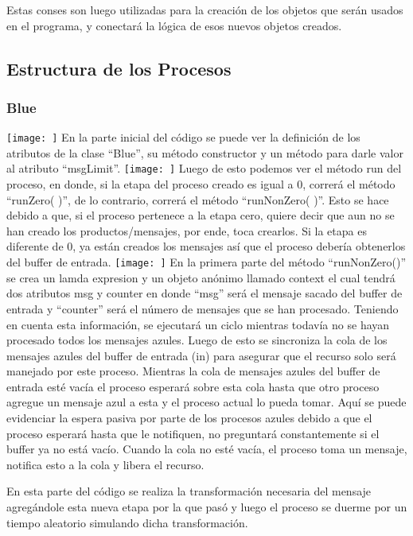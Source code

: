 \documentclass[a4paper]{article}
\begin{document}
    Estas conses son luego utilizadas para la creación de los objetos
    que serán usados en el programa, y conectará la lógica de esos
    nuevos objetos creados. 

    \subsection{Estructura de los Procesos}
        \subsubsection{Blue}
        \texttt{[image: ]}
        En la parte inicial del código se puede ver la definición de los atributos de la clase “Blue”, su método constructor y un método para darle valor al atributo “msgLimit”. 
        \texttt{[image: ]}
        Luego de esto podemos ver el método run del proceso, en donde, si la etapa del proceso creado es igual a 0, correrá el método “runZero( )”, de lo contrario, correrá el método “runNonZero( )”. Esto se hace debido a que, si el proceso pertenece a la etapa cero, quiere decir que aun no se han creado los productos/mensajes, por ende, toca crearlos. Si la etapa es diferente de 0, ya están creados los mensajes así que el proceso debería obtenerlos del buffer de entrada. 
        \texttt{[image: ]}
        En la primera parte del método “runNonZero()” se crea un lamda expresion y un objeto anónimo llamado context el cual tendrá dos atributos msg y counter en donde “msg” será el mensaje sacado del buffer de entrada y “counter” será el número de mensajes que se han procesado. Teniendo en cuenta esta información, se ejecutará un ciclo mientras todavía no se hayan procesado todos los mensajes azules. Luego de esto se sincroniza la cola de los mensajes azules del buffer de entrada (in) para asegurar que el recurso solo será manejado por este proceso. Mientras la cola de mensajes azules del buffer de entrada esté vacía el proceso esperará sobre esta cola hasta que otro proceso agregue un mensaje azul a esta y el proceso actual lo pueda tomar. Aquí se puede evidenciar la espera pasiva por parte de los procesos azules debido a que el proceso esperará hasta que le notifiquen, no preguntará constantemente si el buffer ya no está vacío. Cuando la cola no esté vacía, el proceso toma un mensaje, notifica esto a la cola y libera el recurso. 

        En esta parte del código se realiza la transformación necesaria del mensaje agregándole esta nueva etapa por la que pasó y luego el proceso se duerme por un tiempo aleatorio simulando dicha transformación. 
\end{document}

